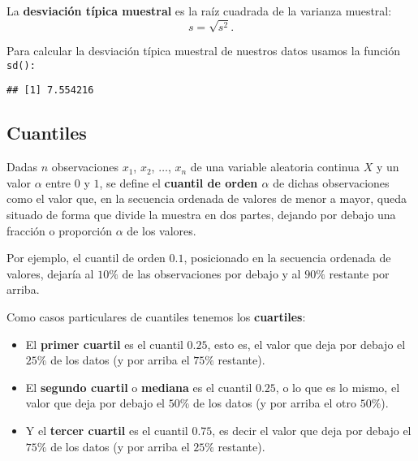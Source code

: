 \documentclass[
  degree=mecinf,
  title=normal,
  toc=normal,
  bib=normal]{mnye}
\newenvironment{Shaded}{\begin{snugshade}}{\end{snugshade}}
\newcommand{\FunctionTok}[1]{\textcolor[rgb]{0.00,0.00,0.00}{#1}}
\newcommand{\NormalTok}[1]{#1}
\newcommand{\SpecialCharTok}[1]{\textcolor[rgb]{0.00,0.00,0.00}{#1}}
\begin{document}
La \textbf{desviación típica muestral} es la raíz cuadrada de la varianza muestral:
\[s=\sqrt{s^2}.\]

Para calcular la desviación típica muestral de nuestros datos usamos la función \texttt{sd():}

\begin{Shaded}
\end{Shaded}

\begin{verbatim}
## [1] 7.554216
\end{verbatim}

\hypertarget{quantiles}{%
\subsection{Cuantiles}\label{quantiles}}

Dadas \(n\) observaciones \(x_1\), \(x_2\), \(\dots\), \(x_n\) de una variable aleatoria continua \(X\) y un valor \(\alpha\) entre \(0\) y \(1\), se define el \textbf{cuantil de orden \(\alpha\)} de dichas observaciones como el valor que, en la secuencia ordenada de valores de menor a mayor, queda situado de forma que divide la muestra en dos partes, dejando por debajo una fracción o proporción \(\alpha\) de los valores.

Por ejemplo, el cuantil de orden \(0.1\), posicionado en la secuencia ordenada de valores, dejaría al \(10\%\) de las observaciones por debajo y al \(90\%\) restante por arriba.

Como casos particulares de cuantiles tenemos los \textbf{cuartiles}:

\begin{itemize}
\item
  El \textbf{primer cuartil} es el cuantil \(0.25\), esto es, el valor que deja por debajo el \(25\%\) de los datos (y por arriba el \(75\%\) restante).
\item
  El \textbf{segundo cuartil} o \textbf{mediana} es el cuantil \(0.25\), o lo que es lo mismo, el valor que deja por debajo el \(50\%\) de los datos (y por arriba el otro \(50\%\)).
\item
  Y el \textbf{tercer cuartil} es el cuantil \(0.75\), es decir el valor que deja por debajo el \(75\%\) de los datos (y por arriba el \(25\%\) restante).
\end{itemize}
\end{document}
